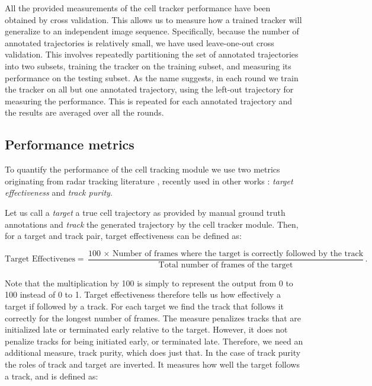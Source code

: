 	All the provided measurements of the cell tracker performance have been obtained by cross validation. This allows us to measure how a trained tracker will generalize to an independent image sequence. Specifically, because the number of annotated trajectories is relatively small, we have used leave-one-out cross validation. This involves repeatedly partitioning the set of annotated trajectories into two subsets, training the tracker on the training subset, and measuring its performance on the testing subset. As the name suggests, in each round we train the tracker on all but one annotated trajectory, using the left-out trajectory for measuring the performance. This is repeated for each annotated trajectory and the results are averaged over all the rounds.

	\subsection{Performance metrics \statusfirstdraft}
	
	To quantify the performance of the cell tracking module we use two metrics originating from radar tracking literature \cite{blackman99}, recently used in other works \cite{bise11global, huh13, eom07}: \textit{target effectiveness} and \textit{track purity}.
	
	Let us call a \textit{target} a true cell trajectory as provided by manual ground truth annotations and \textit{track} the generated trajectory by the cell tracker module. Then, for a target and track pair, target effectiveness can be defined as:
	
	\[
		\text{Target Effectivenes} = \frac{\text{100 $\times$ Number of frames where the target is correctly followed by the track}}{\text{Total number of frames of the target}}\text{.}
	\]
	
	Note that the multiplication by 100 is simply to represent the output from 0 to 100 instead of 0 to 1. 	Target effectiveness therefore tells us how effectively a target if followed by a track. For each target we find the track that follows it correctly for the longest number of frames. The measure penalizes tracks that are initialized late or terminated early relative to the target. However, it does not penalize tracks for being initiated early, or terminated late. Therefore, we need an additional measure, track purity, which does just that. In the case of track purity the roles of track and target are inverted. It measures how well the target follows a track, and is defined as:
	
